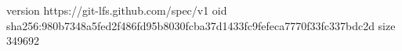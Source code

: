 version https://git-lfs.github.com/spec/v1
oid sha256:980b7348a5fed2f486fd95b8030fcba37d1433fc9fefeca7770f33fc337bdc2d
size 349692
